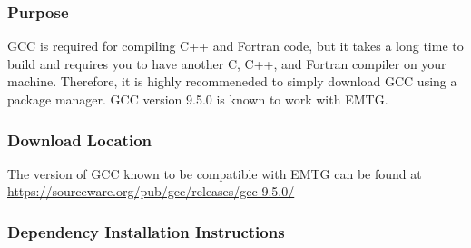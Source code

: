 
\subsubsection{Purpose}

\ac{GCC} is required for compiling C++ and Fortran code, but it takes a long time to build and requires you to have another C, C++, and Fortran compiler on your machine. Therefore, it is highly recommeneded to simply download \ac{GCC} using a package manager. \ac{GCC} version 9.5.0 is known to work with \ac{EMTG}. 

\subsubsection{Download Location}

The version of \ac{GCC} known to be compatible with \ac{EMTG} can be found at \url{https://sourceware.org/pub/gcc/releases/gcc-9.5.0/}

\subsubsection{Dependency Installation Instructions}

